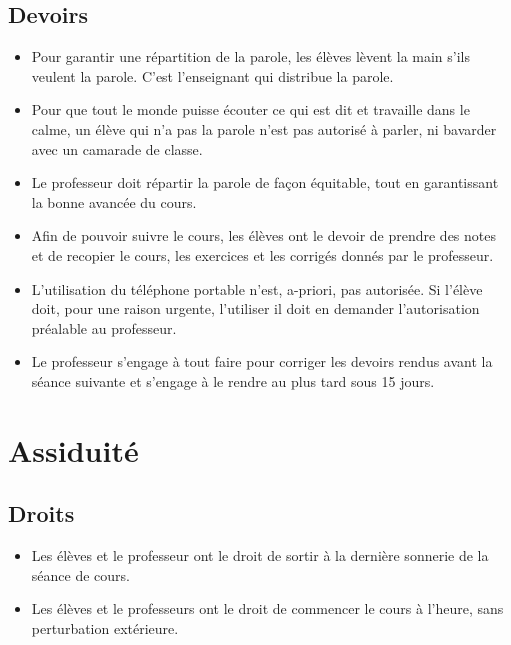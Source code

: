 \documentclass[11pt]{article}
\begin{document}
\subsection{Devoirs}
\begin{itemize}
    \item Pour garantir une répartition de la parole, les élèves lèvent la main s'ils veulent la parole. C'est l'enseignant qui distribue  la parole.
    \item Pour que tout le monde puisse écouter ce qui est dit et travaille dans le calme, un élève qui n'a pas la parole n'est pas autorisé à parler, ni bavarder avec un camarade de classe.
    \item Le professeur doit répartir la parole de façon équitable, tout en garantissant la bonne avancée du cours.
    \item Afin de pouvoir suivre le cours, les élèves ont le devoir de prendre des notes et de recopier le cours, les exercices et les corrigés donnés par le professeur.
    \item L'utilisation du téléphone portable n'est, a-priori, pas autorisée. Si l'élève doit, pour une raison urgente, l'utiliser il doit en demander l'autorisation préalable au professeur.
    \item Le professeur s'engage à tout faire pour corriger les devoirs rendus avant la séance suivante et s'engage à le rendre au plus tard sous 15 jours.
\end{itemize}

\section{Assiduité}
\subsection{Droits}
\begin{itemize}
    \item Les élèves et le professeur ont le droit de sortir à la dernière sonnerie de la séance de cours.
    \item Les élèves et le professeurs ont le droit de commencer le cours à l'heure, sans perturbation extérieure.
\end{itemize}
\end{document}
